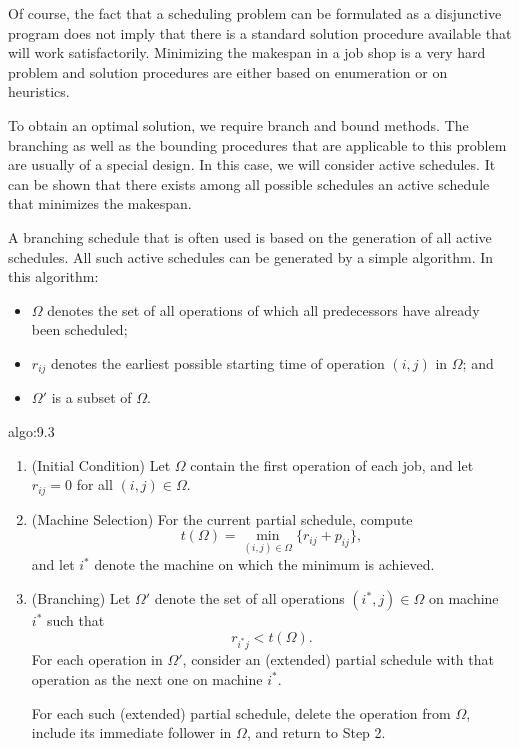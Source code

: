 Of course, the fact that a scheduling problem can be formulated as a 
disjunctive program does not imply that there is a standard solution 
procedure available that will work satisfactorily. Minimizing the makespan 
in a job shop is a very hard problem and solution procedures are either 
based on enumeration or on heuristics. 

To obtain an optimal solution, we require branch and bound methods. 
The branching as well as the bounding procedures that are applicable to this 
problem are usually of a special design. In this case, we will consider 
active schedules. It can be shown that there exists among all possible 
schedules an active schedule that minimizes the makespan. 

A branching schedule that is often used is based on the generation of 
all active schedules. All such active schedules can be generated by a 
simple algorithm. In this algorithm: 
\begin{itemize}
    \item $\Omega$ denotes the set of all operations of which all 
    predecessors have already been scheduled; 
    \item $r_{ij}$ denotes the earliest possible starting time of operation 
    $(i, j)$ in $\Omega$; and 
    \item $\Omega'$ is a subset of $\Omega$. 
\end{itemize}

\begin{algo}{algo:9.3}
    \begin{enumerate}
        \item (Initial Condition) Let $\Omega$ contain the first operation 
        of each job, and let $r_{ij} = 0$ for all $(i, j) \in \Omega$. 

        \item (Machine Selection) For the current partial schedule, compute 
        \[ t(\Omega) = \min_{(i, j) \in \Omega} \{r_{ij} + p_{ij}\}, \] 
        and let $i^*$ denote the machine on which the minimum is achieved. 

        \item (Branching) Let $\Omega'$ denote the set of all operations 
        $(i^*, j) \in \Omega$ on machine $i^*$ such that 
        \[ r_{i^*j} < t(\Omega). \] 
        For each operation in $\Omega'$, consider an (extended) partial 
        schedule with that operation as the next one on machine $i^*$. 
        
        For each such (extended) partial schedule, delete the operation 
        from $\Omega$, include its immediate follower in $\Omega$, 
        and return to Step 2. 
    \end{enumerate}
\end{algo}

